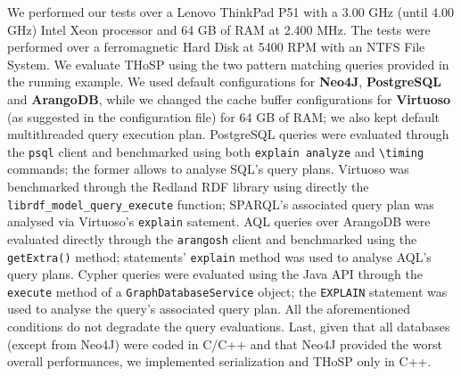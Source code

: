 We performed our tests over a Lenovo ThinkPad P51 with a 3.00 GHz (until 4.00 GHz) Intel Xeon processor and 64 GB of RAM at 2.400 MHz. The tests were performed over a ferromagnetic Hard Disk at 5400 RPM with an NTFS File System. We evaluate THoSP using the two pattern matching queries provided in the running example. 
We used default configurations for  \textbf{Neo4J}, \textbf{PostgreSQL} and \textbf{ArangoDB}, while we changed the cache buffer configurations for \textbf{Virtuoso} (as suggested in the configuration file) for 64 GB of RAM; we also kept  default multithreaded query execution plan. PostgreSQL queries were evaluated through the \texttt{psql} client and benchmarked using both \texttt{explain analyze} and \texttt{\textbackslash timing} commands; the former   allows to analyse SQL's query plans. Virtuoso was benchmarked through the Redland RDF library using directly the \texttt{librdf\_model\_query\_execute} function; SPARQL's associated query plan was analysed via Virtuoso's \texttt{explain} satement. 
AQL queries over {ArangoDB} were evaluated directly through the \texttt{arangosh} client and benchmarked using the \texttt{getExtra()} method; statements' \texttt{explain} method was used to analyse AQL's query plans. %
Cypher queries were evaluated using the Java API through the \texttt{execute} method of a \texttt{GraphDatabaseService} object; the \texttt{EXPLAIN} statement was used to analyse the query's associated query plan.
All the aforementioned conditions do not degradate the query evaluations. Last, given that all databases (except from Neo4J) were coded in C/C++ and that Neo4J provided the worst overall performances, we implemented  serialization and THoSP only in C++.




